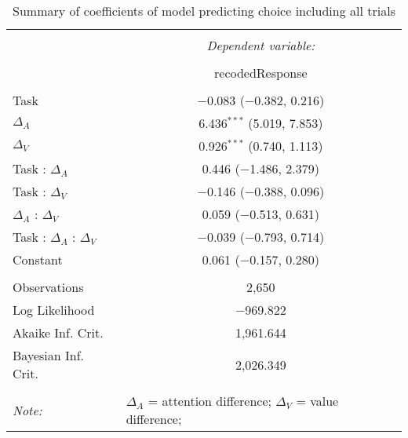 
\begin{table}[!b] \centering 
  \caption{Summary of coefficients of model predicting choice including all trials} 
  \label{table:choiceModelAllTrials} 
\begin{tabular}{@{\extracolsep{5pt}}lc} 
\\[-1.8ex]\hline 
\hline \\[-1.8ex] 
 & \multicolumn{1}{c}{\textit{Dependent variable:}} \\ 
\cline{2-2} 
\\[-1.8ex] & recodedResponse \\ 
\hline \\[-1.8ex] 
 Task & $-$0.083 ($-$0.382, 0.216) \\ 
  $\Delta_A$ & 6.436$^{***}$ (5.019, 7.853) \\ 
  $\Delta_V$ & 0.926$^{***}$ (0.740, 1.113) \\ 
  Task : $\Delta_A$ & 0.446 ($-$1.486, 2.379) \\ 
  Task : $\Delta_V$ & $-$0.146 ($-$0.388, 0.096) \\ 
  $\Delta_A$ : $\Delta_V$ & 0.059 ($-$0.513, 0.631) \\ 
  Task : $\Delta_A$ :  $\Delta_V$ & $-$0.039 ($-$0.793, 0.714) \\ 
  Constant & 0.061 ($-$0.157, 0.280) \\ 
 \hline \\[-1.8ex] 
Observations & 2,650 \\ 
Log Likelihood & $-$969.822 \\ 
Akaike Inf. Crit. & 1,961.644 \\ 
Bayesian Inf. Crit. & 2,026.349 \\ 
\hline 
\hline \\[-1.8ex] 
\textit{Note:}  & \multicolumn{1}{l}{\footnotesize $\Delta_A$ = attention difference; $\Delta_V$ = value difference; } \\ 
\end{tabular} 
\end{table} 
